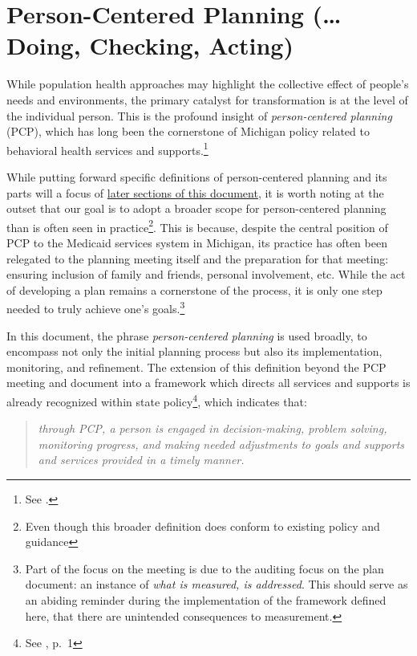 \documentclass[
]{book}
\begin{document}
\hypertarget{pcpdca}{%
\chapter{Person-Centered Planning (\ldots{}Doing, Checking, Acting)}\label{pcpdca}}

While population health approaches may highlight the collective effect of people's needs and environments, the primary catalyst for transformation is at the level of the individual person. This is the profound insight of \emph{person-centered planning} (PCP), which has long been the cornerstone of Michigan policy related to behavioral health services and supports.\footnote{See \citet{mi-mhc}.}

While putting forward specific definitions of person-centered planning and its parts will a focus of \protect\hyperlink{bok}{later sections of this document}, it is worth noting at the outset that our goal is to adopt a broader scope for person-centered planning than is often seen in practice\footnote{Even though this broader definition does conform to existing policy and guidance}. This is because, despite the central position of PCP to the Medicaid services system in Michigan, its practice has often been relegated to the planning meeting itself and the preparation for that meeting: ensuring inclusion of family and friends, personal involvement, etc. While the act of developing a plan remains a cornerstone of the process, it is only one step needed to truly achieve one's goals.\footnote{Part of the focus on the meeting is due to the auditing focus on the plan document: an instance of \emph{what is measured, is addressed}. This should serve as an abiding reminder during the implementation of the framework defined here, that there are unintended consequences to measurement.}

In this document, the phrase \emph{person-centered planning} is used broadly, to encompass not only the initial planning process but also its implementation, monitoring, and refinement. The extension of this definition beyond the PCP meeting and document into a framework which directs all services and supports is already recognized within state policy\footnote{See \citet{pcp-policy}, p.~1}, which indicates that:

\begin{quote}
\emph{through PCP, a person is engaged in decision-making, problem solving, monitoring progress, and making needed adjustments to goals and supports and services provided in a timely manner.}
\end{quote}
\end{document}
